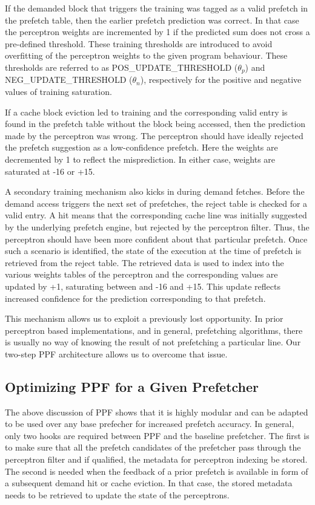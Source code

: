 If the demanded block that triggers the training was tagged as a valid
prefetch in the prefetch table, then the earlier prefetch prediction
was correct.  In that case the perceptron weights are incremented by 1
if the predicted sum does not cross a pre-defined threshold. These
training thresholds are introduced to avoid overfitting of the
perceptron weights to the given program behaviour. These thresholds
are referred to as POS\_UPDATE\_THRESHOLD ($\theta_p$) and
NEG\_UPDATE\_THRESHOLD ($\theta_n$), respectively for the positive and
negative values of training saturation.

If a cache block eviction led to training and the corresponding valid
entry is found in the prefetch table without the block being accessed,
then the prediction made by the perceptron was wrong.  The perceptron
should have ideally rejected the prefetch suggestion as a
low-confidence prefetch.  Here the weights are decremented by 1 to
reflect the misprediction. In either case, weights are saturated at
-16 or +15. %

A secondary training mechanism also kicks in during demand fetches.
Before the demand access triggers the next set of prefetches, the
reject table is checked for a valid entry.  A hit means that the
corresponding cache line was initially suggested by the underlying
prefetch engine, but rejected by the perceptron filter.  Thus, the
perceptron should have been more confident about that particular
prefetch.  Once such a scenario is identified, the
state %
of the execution at the time of prefetch is retrieved from the reject
table.  The retrieved data is used to index into the various weights
tables of the perceptron and the corresponding values are updated by
+1, saturating between and -16 and +15.  This update reflects
increased confidence for the prediction corresponding to that
prefetch.

This mechanism allows us to exploit a previously lost opportunity.  In
prior perceptron based implementations, and in general, prefetching
algorithms, there is usually no way of knowing the result of not
prefetching a particular line.  Our two-step PPF architecture allows
us to overcome that issue.

\subsection{Optimizing PPF for a Given Prefetcher}
\label{Arch-Generalizing}
The above discussion of PPF shows that it is highly modular and can be
adapted to be used over any base prefecher for increased prefetch
accuracy.  In general, only two hooks are required between PPF and the
baseline prefetcher. The first is to make sure that all the prefetch
candidates of the prefetcher pass through the perceptron filter and if
qualified, the metadata for perceptron indexing be stored. The second
is needed when the feedback of a prior prefetch is available in form
of a subsequent demand hit or cache eviction. In that case, the stored
metadata needs to be retrieved to update the state of the perceptrons.

